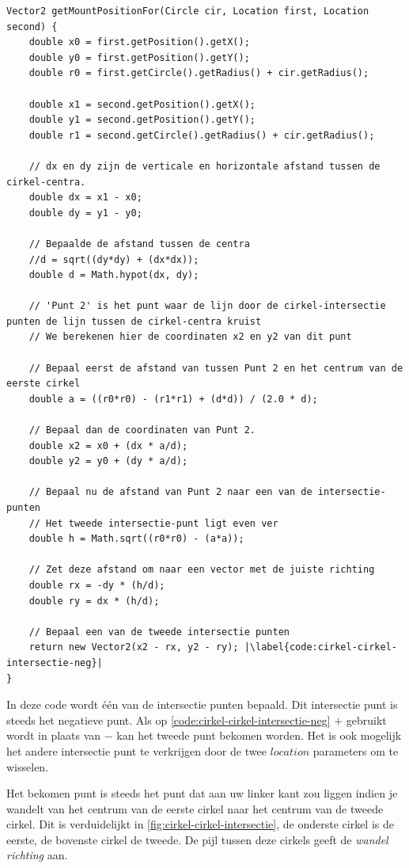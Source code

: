\documentclass[12pt,a4paper,oneside]{book}
\begin{document}
\begin{lstlisting}
Vector2 getMountPositionFor(Circle cir, Location first, Location second) {
	double x0 = first.getPosition().getX();
	double y0 = first.getPosition().getY();
	double r0 = first.getCircle().getRadius() + cir.getRadius();

	double x1 = second.getPosition().getX();
	double y1 = second.getPosition().getY();
	double r1 = second.getCircle().getRadius() + cir.getRadius();

	// dx en dy zijn de verticale en horizontale afstand tussen de cirkel-centra.
	double dx = x1 - x0;
	double dy = y1 - y0;

	// Bepaalde de afstand tussen de centra
	//d = sqrt((dy*dy) + (dx*dx));
	double d = Math.hypot(dx, dy);

	// 'Punt 2' is het punt waar de lijn door de cirkel-intersectie punten de lijn tussen de cirkel-centra kruist
	// We berekenen hier de coordinaten x2 en y2 van dit punt

	// Bepaal eerst de afstand van tussen Punt 2 en het centrum van de eerste cirkel
	double a = ((r0*r0) - (r1*r1) + (d*d)) / (2.0 * d);

	// Bepaal dan de coordinaten van Punt 2.
	double x2 = x0 + (dx * a/d);
	double y2 = y0 + (dy * a/d);

	// Bepaal nu de afstand van Punt 2 naar een van de intersectie-punten
	// Het tweede intersectie-punt ligt even ver
	double h = Math.sqrt((r0*r0) - (a*a));

	// Zet deze afstand om naar een vector met de juiste richting
	double rx = -dy * (h/d);
	double ry = dx * (h/d);

	// Bepaal een van de tweede intersectie punten
	return new Vector2(x2 - rx, y2 - ry); |\label{code:cirkel-cirkel-intersectie-neg}|
}
\end{lstlisting}

In deze code wordt één van de intersectie punten bepaald.
Dit intersectie punt is steeds het negatieve punt.
Als op \autoref{code:cirkel-cirkel-intersectie-neg} $+$ gebruikt wordt in plaats van $-$ kan het tweede punt bekomen worden.
Het is ook mogelijk het andere intersectie punt te verkrijgen door de twee $location$ parameters om te wisselen.

Het bekomen punt is steeds het punt dat aan uw linker kant zou liggen indien je wandelt van het centrum van de eerste cirkel naar het centrum van de tweede cirkel.
Dit is verduidelijkt in \autoref{fig:cirkel-cirkel-intersectie}, de onderste cirkel is de eerste, de bovenste cirkel de tweede.
De pijl tussen deze cirkels geeft de \textit{wandel richting} aan.
\end{document}
